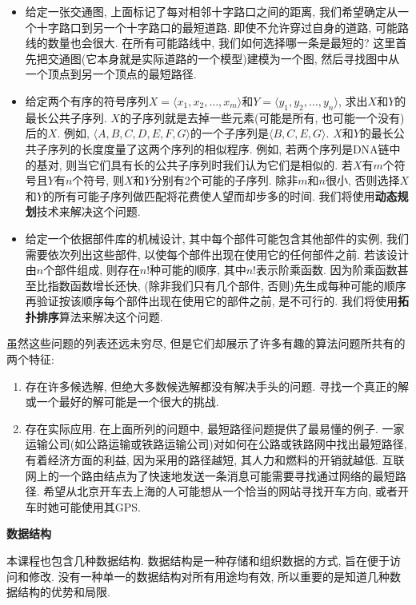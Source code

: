 \documentclass[oneside,10pt,fontset=none]{ctexbook}
\numberwithin{definition}{chapter}
\numberwithin{theorem}{chapter}
\numberwithin{proof}{chapter}
\begin{document}
\begin{itemize}
    \item 给定一张交通图, 上面标记了每对相邻十字路口之间的距离, 我们希望确定从一个十字路口到另一个十字路口的最短道路. 即使不允许穿过自身的道路, 可能路线的数量也会很大. 在所有可能路线中, 我们如何选择哪一条是最短的? 这里首先把交通图(它本身就是实际道路的一个模型)建模为一个图, 然后寻找图中从一个顶点到另一个顶点的最短路径.
    \item 给定两个有序的符号序列$X = \langle x_1, x_2, \dots, x_m\rangle$和$Y=\langle y_1, y_2, \dots, y_n\rangle$, 求出$X$和$Y$的最长公共子序列. $X$的子序列就是去掉一些元素(可能是所有, 也可能一个没有)后的$X$. 例如, $\langle A, B, C, D, E, F, G\rangle$的一个子序列是$\langle B, C, E, G\rangle$. $X$和$Y$的最长公共子序列的长度度量了这两个序列的相似程序. 例如, 若两个序列是DNA链中的基对, 则当它们具有长的公共子序列时我们认为它们是相似的. 若$X$有$m$个符号且$Y$有$n$个符号, 则$X$和$Y$分别有2个可能的子序列. 除非$m$和$n$很小, 否则选择$X$和$Y$的所有可能子序列做匹配将花费使人望而却步多的时间. 我们将使用\textbf{动态规划}技术来解决这个问题.
    \item 给定一个依据部件库的机械设计, 其中每个部件可能包含其他部件的实例, 我们需要依次列出这些部件, 以使每个部件出现在使用它的任何部件之前. 若该设计由$n$个部件组成, 则存在$n!$种可能的顺序, 其中$n!$表示阶乘函数. 因为阶乘函数甚至比指数函数增长还快, (除非我们只有几个部件, 否则)先生成每种可能的顺序再验证按该顺序每个部件出现在使用它的部件之前, 是不可行的. 我们将使用\textbf{拓扑排序}算法来解决这个问题.
\end{itemize}

虽然这些问题的列表还远未穷尽, 但是它们却展示了许多有趣的算法问题所共有的两个特征:

\begin{enumerate}
    \item 存在许多候选解, 但绝大多数候选解都没有解决手头的问题. 寻找一个真正的解或一个最好的解可能是一个很大的挑战.
    \item 存在实际应用. 在上面所列的问题中, 最短路径问题提供了最易懂的例子. 一家运输公司(如公路运输或铁路运输公司)对如何在公路或铁路网中找出最短路径, 有着经济方面的利益, 因为采用的路径越短, 其人力和燃料的开销就越低. 互联网上的一个路由结点为了快速地发送一条消息可能需要寻找通过网络的最短路径. 希望从北京开车去上海的人可能想从一个恰当的网站寻找开车方向, 或者开车时她可能使用其GPS.
\end{enumerate}

\textbf{数据结构}

本课程也包含几种数据结构. 数据结构是一种存储和组织数据的方式, 旨在便于访问和修改. 没有一种单一的数据结构对所有用途均有效, 所以重要的是知道几种数据结构的优势和局限.
\end{document}
